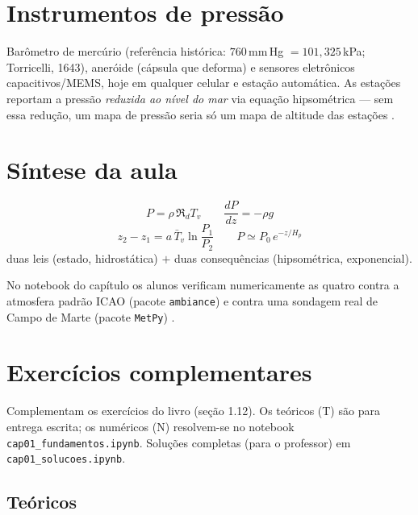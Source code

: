 \documentclass[11pt]{article}
\begin{document}
\section{Instrumentos de pressão}

Barômetro de mercúrio (referência histórica: $760$\,mm\,Hg
$=101{,}325$\,kPa; Torricelli, 1643), aneróide (cápsula que deforma) e
sensores eletrônicos capacitivos/MEMS, hoje em qualquer celular e estação
automática. As estações reportam a pressão \emph{reduzida ao nível do mar}
via equação hipsométrica  —
sem essa redução, um mapa de pressão seria só um mapa de altitude das
estações .

\section{Síntese da aula}

\begin{noquadro}
\[ P = \rho\,\Re_d T_v \qquad \frac{dP}{dz} = -\rho g \]
\[ z_2 - z_1 = a\,\bar T_v\ln\frac{P_1}{P_2} \qquad P \simeq P_0\,e^{-z/H_p} \]
duas leis (estado, hidrostática) $+$ duas consequências (hipsométrica,
exponencial).
\end{noquadro}

No notebook do capítulo os alunos verificam numericamente as quatro contra a
atmosfera padrão ICAO (pacote \texttt{ambiance}) e contra uma sondagem real
de Campo de Marte (pacote \texttt{MetPy}) .

\section{Exercícios complementares}\label{sec:exercicios}

Complementam os exercícios do livro (seção 1.12). Os teóricos (T) são para
entrega escrita; os numéricos (N) resolvem-se no notebook
\texttt{cap01\_fundamentos.ipynb}. Soluções completas (para o professor) em
\texttt{cap01\_solucoes.ipynb}.

\subsection*{Teóricos}
\end{document}
